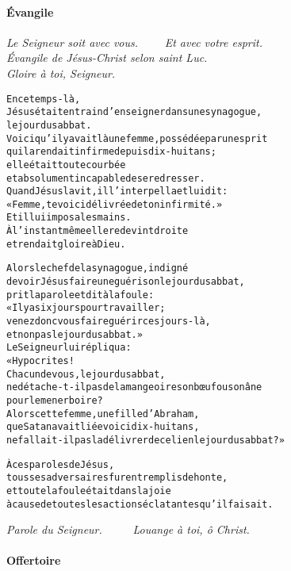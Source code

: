 \documentclass[twoside]{article}
\begin{document}
\paragraph{Évangile}

\emph{\vv Le Seigneur soit avec vous. ~~~~\rr Et avec votre esprit.\\
\vv Évangile de Jésus-Christ selon saint Luc. \\
\rr Gloire à toi, Seigneur.}

\begin{alltt}\normalfont
    En ce temps-là,
    Jésus était en train d’enseigner dans une synagogue,
        le jour du sabbat.
    Voici qu’il y avait là une femme, possédée par un esprit
        qui la rendait infirme depuis dix-huit ans ;
        elle était toute courbée
        et absolument incapable de se redresser.
    Quand Jésus la vit, il l’interpella et lui dit :
        « Femme, te voici délivrée de ton infirmité. »
    Et il lui imposa les mains.
    À l’instant même elle redevint droite
        et rendait gloire à Dieu.

    Alors le chef de la synagogue, indigné
        de voir Jésus faire une guérison le jour du sabbat,
        prit la parole et dit à la foule :
    « Il y a six jours pour travailler ;
        venez donc vous faire guérir ces jours-là,
        et non pas le jour du sabbat. »
    Le Seigneur lui répliqua :
        « Hypocrites !
    Chacun de vous, le jour du sabbat,
        ne détache-t-il pas de la mangeoire son bœuf ou son âne
        pour le mener boire ?
    Alors cette femme, une fille d’Abraham,
        que Satan avait liée voici dix-huit ans,
        ne fallait-il pas la délivrer de ce lien le jour du sabbat ? »

    À ces paroles de Jésus,
        tous ses adversaires furent remplis de honte,
        et toute la foule était dans la joie
        à cause de toutes les actions éclatantes qu’il faisait.
\end{alltt}

\emph{\vv Parole du Seigneur. ~~~~ \rr Louange à toi, ô Christ.}

\paragraph{Offertoire}


\end{document}
